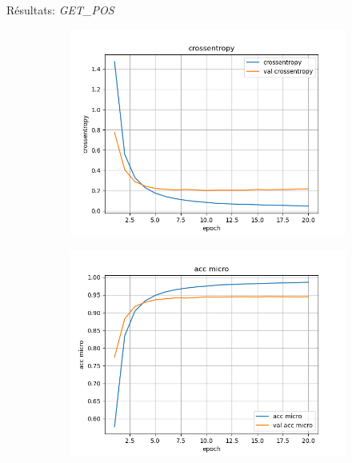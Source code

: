 \documentclass[11pt]{beamer}
\begin{document}
\begin{frame}{Résultats: \textit{GET\_POS} }
    \begin{figure}
        \centering
        \begin{subfigure}{0.32\textwidth}
            \centering
            \includegraphics[width=\linewidth]{../logs/get_pos_French/crossentropy.png}
        \end{subfigure}
        \begin{subfigure}{0.32\textwidth}
            \centering
            \includegraphics[width=\linewidth]{../logs/get_pos_French/acc micro.png}
        \end{subfigure}
        \begin{subfigure}{0.32\textwidth}

\end{subfigure}
\end{figure}
\end{frame}
\end{document}
